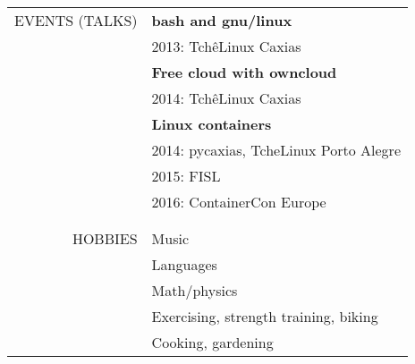 \begin{tabular}{rp{12cm}}
    \uppercase{Events (talks)}
    & \textbf{bash and gnu/linux} \\
    & 2013: TchêLinux Caxias \\
    & \textbf{Free cloud with owncloud} \\
    & 2014: TchêLinux Caxias \\
    & \textbf{Linux containers} \\
    & 2014: pycaxias, TcheLinux Porto Alegre \\
    & 2015: FISL \\
    & 2016: ContainerCon Europe
    \\\\ \hline \\
    \uppercase{Hobbies}
    & Music \\
    & Languages \\
    & Math/physics \\
    & Exercising, strength training, biking \\
    & Cooking, gardening
\end{tabular}
